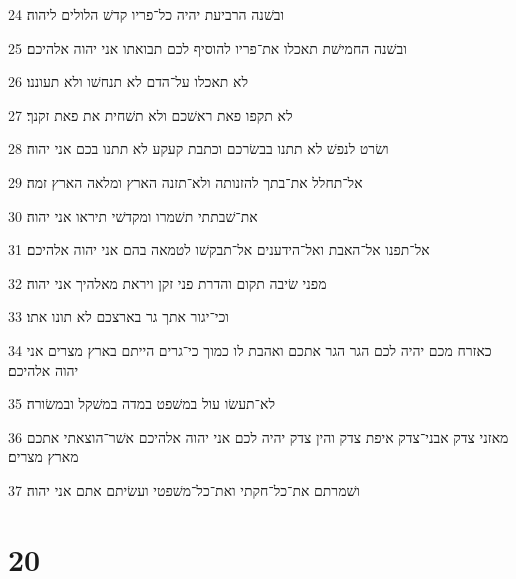 \par 24 ובשׁנה הרביעת יהיה כל־פריו קדשׁ הלולים ליהוה׃
\par 25 ובשׁנה החמישׁת תאכלו את־פריו להוסיף לכם תבואתו אני יהוה אלהיכם׃
\par 26 לא תאכלו על־הדם לא תנחשׁו ולא תעוננו׃
\par 27 לא תקפו פאת ראשׁכם ולא תשׁחית את פאת זקנך׃
\par 28 ושׂרט לנפשׁ לא תתנו בבשׂרכם וכתבת קעקע לא תתנו בכם אני יהוה׃
\par 29 אל־תחלל את־בתך להזנותה ולא־תזנה הארץ ומלאה הארץ זמה׃
\par 30 את־שׁבתתי תשׁמרו ומקדשׁי תיראו אני יהוה׃
\par 31 אל־תפנו אל־האבת ואל־הידענים אל־תבקשׁו לטמאה בהם אני יהוה אלהיכם׃
\par 32 מפני שׂיבה תקום והדרת פני זקן ויראת מאלהיך אני יהוה׃
\par 33 וכי־יגור אתך גר בארצכם לא תונו אתו׃
\par 34 כאזרח מכם יהיה לכם הגר הגר אתכם ואהבת לו כמוך כי־גרים הייתם בארץ מצרים אני יהוה אלהיכם׃
\par 35 לא־תעשׂו עול במשׁפט במדה במשׁקל ובמשׂורה׃
\par 36 מאזני צדק אבני־צדק איפת צדק והין צדק יהיה לכם אני יהוה אלהיכם אשׁר־הוצאתי אתכם מארץ מצרים׃
\par 37 ושׁמרתם את־כל־חקתי ואת־כל־משׁפטי ועשׂיתם אתם אני יהוה׃

\chapter{20}

